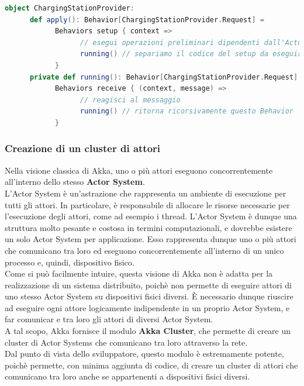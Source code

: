 \newpage

\begin{lstlisting}[language=scala]
object ChargingStationProvider:
      def apply(): Behavior[ChargingStationProvider.Request] = 
            Behaviors setup { context =>
                  // esegui operazioni preliminari dipendenti dall'Actor Context
                  running() // separiamo il codice del setup da eseguire una sola volta con il codice effettivo del Behavior
            }
      private def running(): Behavior[ChargingStationProvider.Request] = 
            Behaviors receive { (context, message) =>
                  // reagisci al messaggio
                  running() // ritorna ricorsivamente questo Behavior
            }
\end{lstlisting}

\subsubsection{Creazione di un cluster di attori}
Nella visione classica di Akka, uno o più attori eseguono concorrentemente all'interno dello stesso
\textbf{Actor System}.\\

L'Actor System è un'astrazione che rappresenta un ambiente di esecuzione per tutti gli attori.
In particolare, è responsabile di allocare le risorse necessarie per l'esecuzione degli attori,
come ad esempio i thread.
L'Actor System è dunque una struttura molto pesante e costosa in termini computazionali, e dovrebbe
esistere un solo Actor System per applicazione.
Esso rappresenta dunque uno o più attori che comunicano tra loro ed eseguono concorrentemente all'interno
di un unico processo e, quindi, dispositivo fisico.\\

Come si può facilmente intuire, questa visione di Akka non è adatta per la realizzazione di un sistema
distribuito, poichè non permette di eseguire attori di uno stesso Actor System su dispositivi fisici
diversi. È necessario dunque riuscire ad eseguire ogni attore logicamente indipendente in un
proprio Actor System, e far comunicar e tra loro gli attori di diversi Actor System.\\

A tal scopo, Akka fornisce il modulo \textbf{Akka Cluster}\cite{akkacluster}, che permette
di creare un cluster di Actor Systems che comunicano tra loro attraverso la rete.\\

Dal punto di vista dello sviluppatore, questo modulo è estremamente potente, poichè permette,
con minima aggiunta di codice, di creare un cluster di attori che comunicano tra loro anche se
appartenenti a dispositivi fisici diversi.\\


